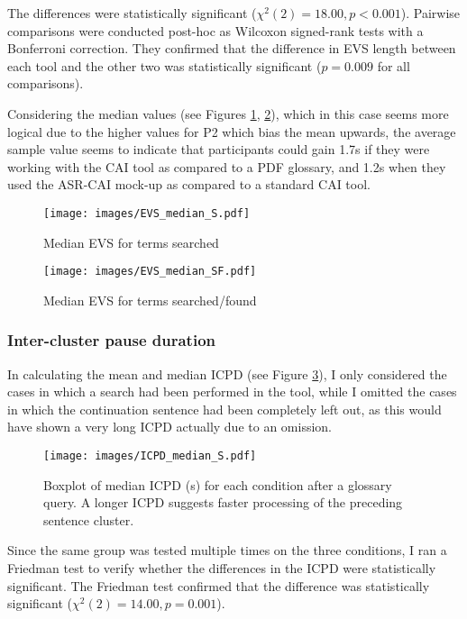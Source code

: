 The differences were statistically significant ($\chi^2(2) = 18.00, p < 0.001$). Pairwise comparisons were conducted post-hoc as Wilcoxon signed-rank tests with a Bonferroni correction. They confirmed that the difference in EVS length between each tool and the other two was statistically significant ($p = 0.009$ for all comparisons).


Considering the median values (see Figures \ref{fig:EVS_S}, \ref{fig:EVS_SF}), which in this case seems more logical due to the higher values for P2 which bias the mean upwards, the average sample value seems to indicate that participants could gain 1.7s if they were working with the CAI tool as compared to a PDF glossary, and 1.2s when they used the ASR-CAI mock-up as compared to a standard CAI tool.

\begin{figure}
\texttt{[image: images/EVS\_median\_S.pdf]}
\caption[Median EVS of terms searched]{Median EVS for terms searched}
\label{fig:EVS_S}
\end{figure}

\begin{figure}
\texttt{[image: images/EVS\_median\_SF.pdf]}
\caption[Median EVS of terms searched/found]{Median EVS for terms searched/found}
\label{fig:EVS_SF}
\end{figure}

\subsubsection{Inter-cluster pause duration} \label{pause_duration}
In calculating the mean and median ICPD (see Figure \ref{fig:ICPDmedianS}), I only considered the cases in which a search had been performed in the tool, while I omitted the cases in which the continuation sentence had been completely left out, as this would have shown a very long ICPD actually due to an omission.

\begin{figure}
\texttt{[image: images/ICPD\_median\_S.pdf]}
\caption[Boxplot of median ICPD after a query]{Boxplot of median ICPD (s) for each condition after a glossary query. A longer ICPD suggests faster processing of the preceding sentence cluster.}
\label{fig:ICPDmedianS}
\end{figure}

Since the same group was tested multiple times on the three conditions, I ran a Friedman test to verify whether the differences in the ICPD were statistically significant. The Friedman test confirmed that the difference was statistically significant ($\chi^2(2) = 14.00, p= 0.001$).

